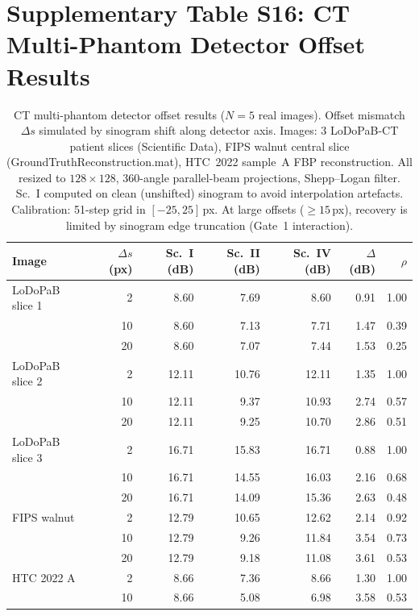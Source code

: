 \documentclass[11pt]{article}
\begin{document}
\section{Supplementary Table S16: CT Multi-Phantom Detector Offset Results}
\label{sec:cbct_scenes}

\begin{table}[htbp]
\centering
\caption{CT multi-phantom detector offset results ($N{=}5$ real images). Offset mismatch $\Delta s$ simulated by sinogram shift along detector axis.
Images: 3 LoDoPaB-CT patient slices (Scientific Data), FIPS walnut central slice (GroundTruthReconstruction.mat), HTC~2022 sample~A FBP reconstruction.
All resized to $128 \times 128$, 360-angle parallel-beam projections, Shepp--Logan filter.
Sc.~I computed on clean (unshifted) sinogram to avoid interpolation artefacts.
Calibration: 51-step grid in $[-25, 25]$\,px.
At large offsets ($\geq 15$\,px), recovery is limited by sinogram edge truncation (Gate~1 interaction).}
\label{tab:cbct_scenes}
\small
\begin{tabular}{l r r r r r r}
\toprule
Image & $\Delta s$ (px) & Sc.~I (dB) & Sc.~II (dB) & Sc.~IV (dB) & $\Delta$(dB) & $\rho$ \\
\midrule
LoDoPaB slice 1 &  2 &  8.60 &  7.69 &  8.60 & 0.91 & 1.00 \\
                & 10 &  8.60 &  7.13 &  7.71 & 1.47 & 0.39 \\
                & 20 &  8.60 &  7.07 &  7.44 & 1.53 & 0.25 \\
LoDoPaB slice 2 &  2 & 12.11 & 10.76 & 12.11 & 1.35 & 1.00 \\
                & 10 & 12.11 &  9.37 & 10.93 & 2.74 & 0.57 \\
                & 20 & 12.11 &  9.25 & 10.70 & 2.86 & 0.51 \\
LoDoPaB slice 3 &  2 & 16.71 & 15.83 & 16.71 & 0.88 & 1.00 \\
                & 10 & 16.71 & 14.55 & 16.03 & 2.16 & 0.68 \\
                & 20 & 16.71 & 14.09 & 15.36 & 2.63 & 0.48 \\
FIPS walnut     &  2 & 12.79 & 10.65 & 12.62 & 2.14 & 0.92 \\
                & 10 & 12.79 &  9.26 & 11.84 & 3.54 & 0.73 \\
                & 20 & 12.79 &  9.18 & 11.08 & 3.61 & 0.53 \\
HTC 2022 A      &  2 &  8.66 &  7.36 &  8.66 & 1.30 & 1.00 \\
                & 10 &  8.66 &  5.08 &  6.98 & 3.58 & 0.53 \\

\end{tabular}
\end{table}
\end{document}
